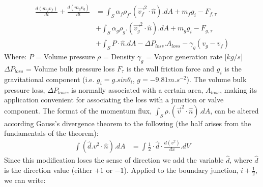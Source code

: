 \documentclass[11pt,letterpaper,titlepage]{article}
\newcommand{\half}{\frac{1}{2}}
\begin{document}
\begin{equation*}
\begin{aligned}
\frac{d(m_fv_f)}{dt}+\frac{d(m_gv_g)}{dt}
&=\int_S \alpha_f\rho_f. (\vec{v_f}^2\cdot \hat{n}).dA +m_fg_i-F_{f,\tau}\\
&+\int_S \alpha_g\rho_g. (\vec{v_g}^2\cdot \hat{n}).dA +m_gg_i-F_{g,\tau}\\
&+\int_S P\cdot \hat{n}.dA- \Delta P_{loss}.A_{loss} - \gamma_g (v_g - v_f) 
\end{aligned}
\end{equation*}
\newline
\noindent 
Where: 
\newline \noindent $P$ \quad \quad \quad= Volume pressure
\newline \noindent $\rho$ \quad \quad \quad= Density
\newline \noindent $\gamma_g$ \quad \quad \quad= Vapor generation rate [$kg/s$]
\newline \noindent $\Delta P_{loss}$ \quad = Volume bulk pressure loss
\newline
\newline
$F_{\tau}$ is the wall friction force and $g_i$ is the gravitational component (i.e. $g_i=g.sin\theta_i$, $g=-9.81 m.s^{-2}$). The volume bulk pressure loss, $\Delta P_{loss}$, is normally associated with a certain area, $A_{loss}$, making its application convenient for associating the loss with a junction or valve component.
\newline
\newline
The format of the momentum flux, $\int_S \rho. (\vec{v}^2\cdot \hat{n}).dA$, can be altered according Gauss's divergence theorem to the following (the half arises from the fundamentals of the theorem):
\newline
\begin{equation*}
\begin{aligned}
\int (\hat{d}.v^2\cdot \hat{n}).dA &=\int \half\cdot \hat{d}\cdot \frac{d(v^2)}{dx}.dV
\end{aligned}
\end{equation*}
\newline
Since this modification loses the sense of direction we add the variable $\hat{d}$, where $\hat{d}$ is the direction value (either $+1$ or $-1$).
\newline
\newline
\noindent
Applied to the boundary junction, $i+\half$, we can write:
\end{document}
